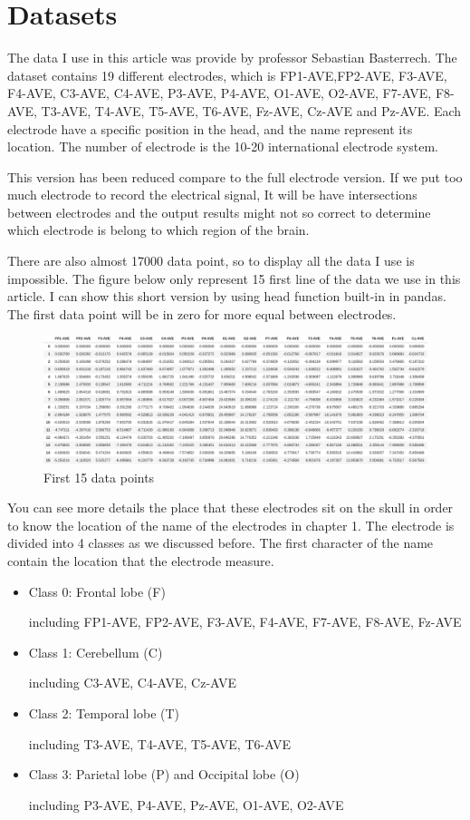 \section{Datasets}
    The data I use in this article was provide by professor Sebastian Basterrech. The dataset contains 19 different electrodes, which is FP1-AVE,FP2-AVE, F3-AVE, F4-AVE, C3-AVE,  C4-AVE, P3-AVE, P4-AVE, O1-AVE,  O2-AVE, F7-AVE, F8-AVE, T3-AVE, T4-AVE, T5-AVE, T6-AVE, Fz-AVE, Cz-AVE and Pz-AVE. Each electrode have a specific position in the head, and the name represent its location. The number of electrode is the 10-20 international electrode system.
    
    This version has been reduced compare to the full electrode version. If we put too much electrode to record the electrical signal, It will be have intersections between electrodes and the output results might not so correct to determine which electrode is belong to which region of the brain.
    
    There are also almost 17000 data point, so to display all the data I use is impossible. The figure below only represent 15 first line of the data we use in this article. I can show this short version by using head\(\) function built-in in pandas. The first data point will be in zero for more equal between electrodes.

    \begin{figure}[h]
        \centering
        \includegraphics[width=1\textwidth]{images/data.png}
        \caption{First 15 data points}
    \end{figure}

    You can see more details the place that these electrodes sit on the skull in order to know the location of the name of the electrodes in chapter 1. The electrode is divided into 4 classes as we discussed before. The first character of the name contain the location that the electrode measure.
    
    \begin{itemize}
        \item Class 0: Frontal lobe (F) 
        
        including FP1-AVE, FP2-AVE, F3-AVE, F4-AVE, F7-AVE, F8-AVE, Fz-AVE
        \item Class 1: Cerebellum (C) 
        
        including C3-AVE, C4-AVE, Cz-AVE
        \item Class 2: Temporal lobe (T) 
        
        including T3-AVE, T4-AVE, T5-AVE, T6-AVE
        \item Class 3: Parietal lobe (P) and Occipital lobe (O) 
        
        including P3-AVE, P4-AVE, Pz-AVE, O1-AVE,  O2-AVE
    \end{itemize}
    
    